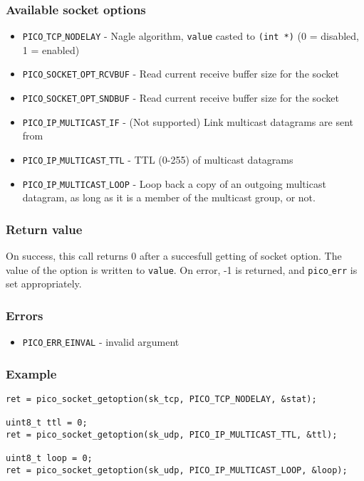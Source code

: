 \subsubsection*{Available socket options}
\begin{itemize}[noitemsep]
\item \texttt{PICO$\_$TCP$\_$NODELAY} - Nagle algorithm, \texttt{value} casted to \texttt{(int *)} (0 = disabled, 1 = enabled)
\item \texttt{PICO$\_$SOCKET$\_$OPT$\_$RCVBUF} - Read current receive buffer size for the socket
\item \texttt{PICO$\_$SOCKET$\_$OPT$\_$SNDBUF} - Read current receive buffer size for the socket
\item \texttt{PICO$\_$IP$\_$MULTICAST$\_$IF} - (Not supported) Link multicast datagrams are sent from
\item \texttt{PICO$\_$IP$\_$MULTICAST$\_$TTL} - TTL (0-255) of multicast datagrams
\item \texttt{PICO$\_$IP$\_$MULTICAST$\_$LOOP} - Loop back a copy of an outgoing multicast datagram, as long as it is a member of the multicast group, or not.
\end{itemize}

\subsubsection*{Return value}
On success, this call returns 0 after a succesfull getting of socket option. The value of
the option is written to \texttt{value}.
On error, -1 is returned, and \texttt{pico$\_$err} is set appropriately.

\subsubsection*{Errors}
\begin{itemize}[noitemsep]
\item \texttt{PICO$\_$ERR$\_$EINVAL} - invalid argument
\end{itemize}

\subsubsection*{Example}
\begin{verbatim}
ret = pico_socket_getoption(sk_tcp, PICO_TCP_NODELAY, &stat);

uint8_t ttl = 0;
ret = pico_socket_getoption(sk_udp, PICO_IP_MULTICAST_TTL, &ttl);

uint8_t loop = 0;
ret = pico_socket_getoption(sk_udp, PICO_IP_MULTICAST_LOOP, &loop);
\end{verbatim}
